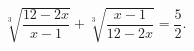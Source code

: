 \begin{ex}[type=equation]
	\begin{condition}
		$\sqrt[3]{\dfrac{12 - 2x}{x - 1}}+\sqrt[3]{\dfrac{x - 1}{12 - 2x}} = \dfrac{5}{2}.$
	\end{condition}
\end{ex}